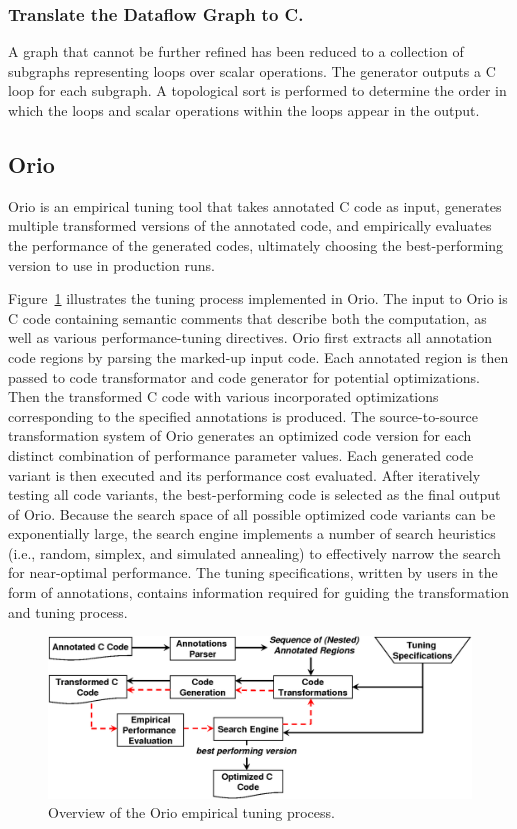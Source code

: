 \documentclass[runningheads]{llncs}
\begin{document}
\subsubsection{Translate the Dataflow Graph to C.}

A graph that cannot be further refined has been reduced to a collection of subgraphs representing loops over scalar operations. The generator outputs a C loop for each subgraph.  A topological sort is performed to determine the order in which the loops and scalar operations within the loops appear in the output.
\subsection{Orio}
\label{sec:orio}

Orio\cite{Norris:2007,ipdps09} is an empirical tuning tool that takes annotated C code as input,
generates multiple transformed versions of the annotated code, and
empirically evaluates the performance of the generated codes,
ultimately choosing the best-performing version to use in production
runs.

Figure~\ref{fig:orio} illustrates the tuning process implemented in
Orio. The input to Orio is C code containing semantic comments that
describe both the computation, as well as various performance-tuning
directives. Orio first extracts all annotation code regions by parsing
the marked-up input code. Each annotated region is then passed to code
transformator and code generator for potential optimizations. Then the
transformed C code with various incorporated optimizations
corresponding to the specified annotations is produced. The
source-to-source transformation system of Orio generates an optimized
code version for each distinct combination of performance parameter
values. Each generated code variant is then executed and its
performance cost evaluated. After iteratively testing all code
variants, the best-performing code is selected as the final output of
Orio. Because the search space of all possible optimized code variants
can be exponentially large, the search engine implements a number of
search heuristics (i.e., random, simplex, and simulated annealing) to
effectively narrow the search for near-optimal performance. The tuning
specifications, written by users in the form of annotations, contains
information required for guiding the transformation and tuning
process.

\begin{figure}[tb]
\vspace{-.1in}
\begin{center}
\includegraphics[width=.65\textwidth]{figures/orio.png}
\end{center}
\vspace{-.25in}
\caption{Overview of the Orio empirical tuning process.}
\label{fig:orio}
\end{figure}
\end{document}
